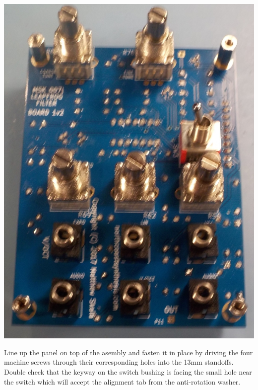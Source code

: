 \nopagebreak
\noindent\includegraphics[width=\linewidth]{panel-components.jpg}

Line up the panel on top of the asembly and fasten it in place by driving
the four machine screws through their corresponding holes into the 13mm
standoffs.  Double check that the keyway on the switch bushing is facing the
small hole near the switch which will accept the alignment tab from the
anti-rotation washer.

